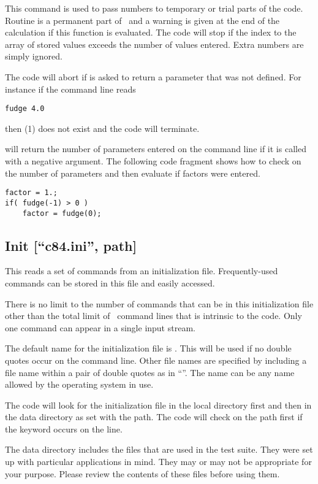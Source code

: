 This command is used to pass numbers to temporary or trial parts of the
code.  Routine  is a permanent part of \Cloudy\ and
a warning is given
at the end of the calculation if this function is evaluated.
The code will
stop if the index to the array of stored values exceeds
the number of values
entered.
Extra numbers are simply ignored.

The code will abort if  is asked to return
a parameter that was not defined.
For instance if the command line reads
\begin{verbatim}
fudge 4.0
\end{verbatim}
then (1) does not exist and the code will terminate.

 will return the number of parameters entered
on the command line
if it is called with a negative argument.
The following code fragment shows
how to check on the number of parameters and then evaluate
 if  factors were entered.
\begin{verbatim}
factor = 1.;
if( fudge(-1) > 0 )
    factor = fudge(0);
\end{verbatim}

\subsection{Init [``c84.ini'', path]}

This reads a set of commands from an initialization file.
Frequently-used
commands can be stored in this file and easily accessed.

There is no limit to the number of commands that can be in this
initialization file other than the total limit of \NKRD\ command lines
that is intrinsic to the code.
Only one  command can appear in a single
input stream.

The default name for the initialization file is .  This will
be used if no double quotes occur on the command line.
Other file names
are specified by including a file name within a pair of double quotes as
in ``''.
The name can be any name allowed by the operating system in use.

The code will look for the initialization file in the local directory
first and then in the data directory as set with the path.
The code will
check on the path first if the keyword  occurs on the
 line.

The data directory includes the  files that are used
in the test suite.
They were set up with particular applications in mind.
They may or may
not be appropriate for your purpose.
Please review the contents of these
files before using them.

